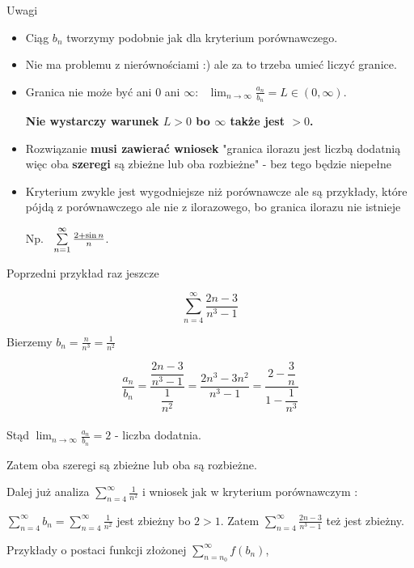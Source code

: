 Uwagi

\begin{itemize}
    \item Ciąg $b_n$ tworzymy podobnie jak dla kryterium porównawczego.
    \item Nie ma problemu z nierównościami :) ale za to trzeba umieć liczyć granice.
    \item Granica nie może być ani 0 ani $\infty$: \ $ \lim_{n \to \infty} \frac{a_n}{b_n} = L \in (0, \infty) $.
    
    \textbf{Nie wystarczy warunek $L > 0$ bo $\infty$ także jest $ > 0$.}
    \item Rozwiązanie \textbf{musi zawierać wniosek} "granica ilorazu jest liczbą dodatnią więc oba
    \textbf{szeregi} są zbieżne lub oba rozbieżne" - bez tego będzie niepełne
    
    \item Kryterium zwykle jest wygodniejsze niż porównawcze ale są przykłady, które pójdą z porównawczego ale nie z
    ilorazowego, bo granica ilorazu nie istnieje
    
    Np. \ $ \sum\limits_{n = 1}^{\infty} \frac{2 + \sin n}{n} $.
\end{itemize}

\begin{przyklad}

Poprzedni przykład raz jeszcze 

$$ \sum\limits_{n = 4}^{\infty} \frac{2n - 3}{n^3 - 1} $$

Bierzemy $ b_n = \frac{n}{n^3} = \frac{1}{n^2} $

$$ \dfrac{a_n}{b_n} = \dfrac{\dfrac{2n - 3}{n^3 - 1}}{\dfrac{1}{n^2}} = \dfrac{2n^3 - 3n^2}{n^3 - 1}
= \dfrac{2 - \dfrac{3}{n}}{1 - \dfrac{1}{n^3}} $$ \\

Stąd $ \lim_{n \to \infty} \frac{a_n}{b_n} = 2 $ - liczba dodatnia.

Zatem oba szeregi są zbieżne lub oba są rozbieżne.

Dalej już analiza $ \sum\limits_{n = 4}^{\infty} \frac{1}{n^2} $ i wniosek jak w kryterium porównawczym :

$ \sum\limits_{n = 4}^{\infty} b_n = \sum\limits_{n = 4}^{\infty} \frac{1}{n^2} $ jest zbieżny bo $ 2 > 1 $.
Zatem $ \sum\limits_{n = 4}^{\infty} \frac{2n - 3}{n^3 - 1} $ też jest zbieżny.
\end{przyklad}

Przykłady o postaci funkcji złożonej $ \sum\limits_{n = n_0}^{\infty} f(b_n) $,

